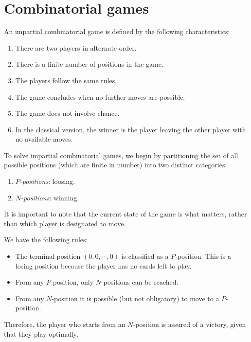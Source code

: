 \section{Combinatorial games}

\begin{definition}
    An impartial combinatorial game is defined by the following characteristics:
    \begin{enumerate}
        \item There are two players in alternate order.
        \item There is a finite number of positions in the game.
        \item The players follow the same rules.
        \item The game concludes when no further moves are possible.
        \item The game does not involve chance. 
        \item In the classical version, the winner is the player leaving the other player with no available moves.
    \end{enumerate}
\end{definition}
\noindent To solve impartial combinatorial games, we begin by partitioning the set of all possible positions (which are finite in number) into two distinct categories:
\begin{enumerate}
    \item \textit{$P$-positions}: loosing.
    \item \textit{$N$-positions}: winning.
\end{enumerate}
\noindent It is important to note that the current state of the game is what matters, rather than which player is designated to move.

We have the following rules:
\begin{itemize}
    \item The terminal position $(0, 0, \cdots, 0)$ is classified as a $P$-position. 
        This is a losing position because the player has no cards left to play.
    \item From any $P$-position, only $N$-positions can be reached. 
    \item From any $N$-position it is possible (but not obligatory) to move to a $P$-position. 
\end{itemize}
\noindent Therefore, the player who starts from an $N$-position is assured of a victory, given that they play optimally. 

